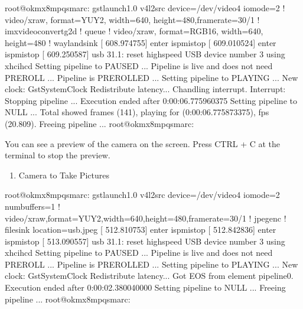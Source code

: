 \documentclass[letterpaper,10pt,openany,english]{sphinxmanual}
\begin{document}
\begin{sphinxVerbatim}[commandchars=\\\{\}]
root@ok\PYGZhy{}mx8mpq\PYGZhy{}smarc:\PYGZti{}\PYGZsh{} gst\PYGZhy{}launch\PYGZhy{}1.0 v4l2src device=/dev/video4 io\PYGZhy{}mode=2 ! video/x\PYGZhy{}raw, format=YUY2, width=640, height=480,framerate=30/1 ! imxvideoconvert\PYGZus{}g2d ! queue ! video/x\PYGZhy{}raw, format=RGB16, width=640, height=480 ! waylandsink
[  608.974755] enter isp\PYGZus{}mi\PYGZus{}stop
[  609.010524] enter isp\PYGZus{}mi\PYGZus{}stop
[  609.250587] usb 3\PYGZhy{}1.1: reset high\PYGZhy{}speed USB device number 3 using xhci\PYGZhy{}hcd
Setting pipeline to PAUSED ...
Pipeline is live and does not need PREROLL ...
Pipeline is PREROLLED ...
Setting pipeline to PLAYING ...
New clock: GstSystemClock
Redistribute latency...
\PYGZca{}Chandling interrupt.
Interrupt: Stopping pipeline ...
Execution ended after 0:00:06.775960375
Setting pipeline to NULL ...
Total showed frames (141), playing for (0:00:06.775873375), fps (20.809).
Freeing pipeline ...
root@ok\PYGZhy{}mx8mpq\PYGZhy{}smarc:\PYGZti{}\PYGZsh{}
\end{sphinxVerbatim}

\sphinxAtStartPar
You can see a preview of the camera on the screen. Press CTRL + C at the terminal to stop the preview.
\begin{enumerate}
%
\setcounter{enumi}{1}
\item {} 
\sphinxAtStartPar
Camera to Take Pictures

\end{enumerate}

\begin{sphinxVerbatim}[commandchars=\\\{\}]
root@ok\PYGZhy{}mx8mpq\PYGZhy{}smarc:\PYGZti{}\PYGZsh{} gst\PYGZhy{}launch\PYGZhy{}1.0 v4l2src device=/dev/video4 io\PYGZhy{}mode=2 num\PYGZhy{}buffers=1 ! video/x\PYGZhy{}raw,format=YUY2,width=640,height=480,framerate=30/1 ! jpegenc ! filesink location=usb.jpeg
[  512.810753] enter isp\PYGZus{}mi\PYGZus{}stop
[  512.842836] enter isp\PYGZus{}mi\PYGZus{}stop
[  513.090557] usb 3\PYGZhy{}1.1: reset high\PYGZhy{}speed USB device number 3 using xhci\PYGZhy{}hcd
Setting pipeline to PAUSED ...
Pipeline is live and does not need PREROLL ...
Pipeline is PREROLLED ...
Setting pipeline to PLAYING ...
New clock: GstSystemClock
Redistribute latency...
Got EOS from element \PYGZdq{}pipeline0\PYGZdq{}.
Execution ended after 0:00:02.380040000
Setting pipeline to NULL ...
Freeing pipeline ...
root@ok\PYGZhy{}mx8mpq\PYGZhy{}smarc:\PYGZti{}\PYGZsh{}
\end{sphinxVerbatim}
\end{document}
